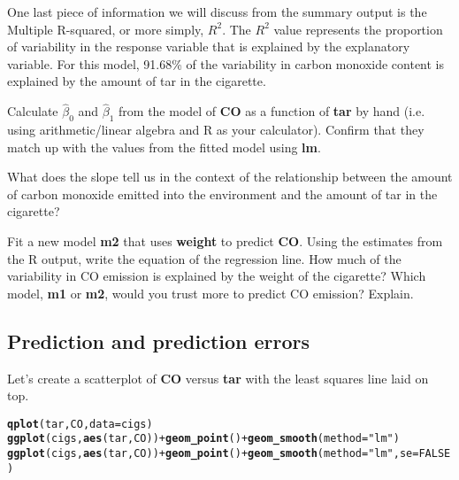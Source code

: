 \documentclass{article}\usepackage[]{graphicx}\usepackage[]{color}
\makeatletter
\newcommand{\hlnum}[1]{\textcolor[rgb]{0.686,0.059,0.569}{#1}}%
\newcommand{\hlstr}[1]{\textcolor[rgb]{0.192,0.494,0.8}{#1}}%
\newcommand{\hlopt}[1]{\textcolor[rgb]{0,0,0}{#1}}%
\newcommand{\hlstd}[1]{\textcolor[rgb]{0.345,0.345,0.345}{#1}}%
\newcommand{\hlkwc}[1]{\textcolor[rgb]{0.333,0.667,0.333}{#1}}%
\newcommand{\hlkwd}[1]{\textcolor[rgb]{0.737,0.353,0.396}{\textbf{#1}}}%
\newenvironment{kframe}{%
 \def\at@end@of@kframe{}%
 \ifinner\ifhmode%
  \def\at@end@of@kframe{\end{minipage}}%
  \begin{minipage}{\columnwidth}%
 \fi\fi%
 \def\FrameCommand##1{\hskip\@totalleftmargin \hskip-\fboxsep
 \colorbox{shadecolor}{##1}\hskip-\fboxsep
     \hskip-\linewidth \hskip-\@totalleftmargin \hskip\columnwidth}%
 \MakeFramed {\advance\hsize-\width
   \@totalleftmargin\z@ \linewidth\hsize
   \@setminipage}}%
 {\par\unskip\endMakeFramed%
 \at@end@of@kframe}
\newenvironment{knitrout}{}{} %
\makeatother
\begin{document}
One last piece of information we will discuss from the summary output is the Multiple R-squared, or more simply, $R^2$. The $R^2$ value represents the proportion of variability in the response variable that is explained by the explanatory variable. For this model, 91.68\% of the variability in carbon monoxide content is explained by the amount of tar in the cigarette.


\begin{exercise}
Calculate $\hat\beta_0$ and $\hat\beta_1$ from the model of \hlkwd{CO} as a function of \hlkwd{tar} by hand (i.e. using arithmetic/linear algebra and R as your calculator). Confirm that they match up with the values from the fitted model using \hlkwd{lm}.
\end{exercise}


\begin{exercise}
What does the slope tell us in the context of the relationship between the amount of carbon monoxide emitted into the environment and the amount of tar in the cigarette?
\end{exercise}

\begin{exercise}
Fit a new model \hlkwd{m2} that uses \hlkwd{weight} to predict \hlkwd{CO}.  Using the estimates from the R output, write the equation of the regression line. How much of the variability in CO emission is explained by the weight of the cigarette? Which model,  \hlkwd{m1} or  \hlkwd{m2}, would you trust more to predict CO emission? Explain.
\end{exercise}

\subsection*{Prediction and prediction errors}

Let's create a scatterplot of \hlkwd{CO} versus \hlkwd{tar} with the least squares line laid on top.

\begin{knitrout}
\color{fgcolor}\begin{kframe}
\begin{alltt}
\hlkwd{qplot}\hlstd{(tar, CO,} \hlkwc{data}\hlstd{=cigs)}
\hlkwd{ggplot}\hlstd{(cigs,} \hlkwd{aes}\hlstd{(tar, CO))} \hlopt{+} \hlkwd{geom_point}\hlstd{()} \hlopt{+} \hlkwd{geom_smooth}\hlstd{(}\hlkwc{method}\hlstd{=}\hlstr{"lm"}\hlstd{)}
\hlkwd{ggplot}\hlstd{(cigs,} \hlkwd{aes}\hlstd{(tar, CO))} \hlopt{+} \hlkwd{geom_point}\hlstd{()} \hlopt{+} \hlkwd{geom_smooth}\hlstd{(}\hlkwc{method}\hlstd{=}\hlstr{"lm"}\hlstd{,} \hlkwc{se}\hlstd{=}\hlnum{FALSE}\hlstd{)}
\end{alltt}
\end{kframe}
\end{knitrout}
\end{document}
